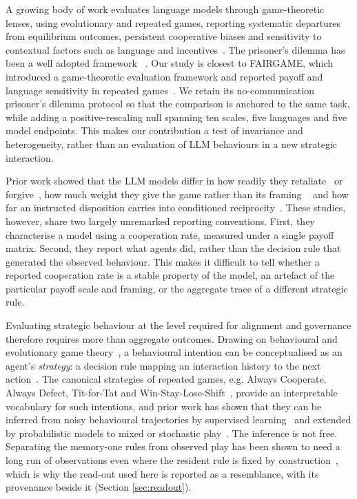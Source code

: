 \documentclass[11pt,a4paper]{article}
\begin{document}
A growing body of work evaluates language models through game-theoretic
lenses, using evolutionary and repeated games, reporting
systematic departures from equilibrium outcomes, persistent cooperative biases and
sensitivity to contextual factors such as language and
incentives~\cite{buscemi2025fairgame,sun2025gtllm_survey,mao2025alympics,pal2026strategiescooperationdefectionlarge,willis2025will,fan2024can,pires2025large,fu2026optimal,xie2026evolutionary}.
The prisoner's dilemma has been a well adopted framework ~\cite{axelrod1981evolution,axelrod1984evolution,nowak1992tit,nowak1993strategy,nowak2006five,pressDyson2012}.
Our study is closest to FAIRGAME, which introduced a game-theoretic
evaluation framework and reported payoff and language sensitivity in repeated
games~\cite{buscemi2025fairgame}. We retain its no-communication prisoner's
dilemma protocol so that the comparison is anchored to the same task, while
adding a positive-rescaling null spanning ten scales, five languages and five
model endpoints. This makes our
contribution a test of invariance and heterogeneity, rather than an evaluation of LLM behaviours in a new strategic interaction.

Prior work showed that the LLM models differ
in how readily they retaliate~\cite{akata2025} or 
forgive~\cite{fontana2025nicer}, how much weight they give the game rather than
its framing  ~\cite{loreheydari2024strategic} and how far an instructed
disposition carries into conditioned
reciprocity~\cite{phelps2023investigating}. These studies, however, share two largely unremarked reporting conventions. First, they characterise a model using a cooperation rate, measured under a single payoff matrix. Second, they report what agents did, rather than the decision rule that generated the observed behaviour. This makes it difficult to tell whether a reported cooperation rate is a stable property of the model, an artefact of the particular payoff scale and framing, or the aggregate trace of a different strategic rule.

Evaluating strategic behaviour at the level required for alignment and governance therefore requires more than aggregate outcomes. Drawing on
behavioural and evolutionary game theory~\cite{sigmund:2010bo}, a behavioural
intention can be conceptualised as an agent's \emph{strategy}: a decision rule
mapping an interaction history to the next
action~\cite{han2013intention,diStefanoIntention2023,Han2012ALIFEjournal,fujimoto2019functional}.
The canonical strategies of repeated games, e.g. Always Cooperate, Always Defect,
Tit-for-Tat and Win-Stay-Lose-Shift~\cite{Axelrod1980Effective,sigmund:2010bo},
provide an interpretable vocabulary for such intentions, and prior work has
shown that they can be inferred from noisy behavioural trajectories by
supervised learning~\cite{han2013intention,diStefanoIntention2023} and extended by
probabilistic models to mixed or stochastic play~\cite{inferenceStrategies}.
The inference is not free. Separating the memory-one rules from observed play
has been shown to need a long run of observations even where the resident rule
is fixed by construction~\cite{kim2021win,hilbe2013memory}, which is why the
read-out used here is reported as a resemblance, with its provenance beside it
(Section \ref{sec:readout}).
\end{document}
